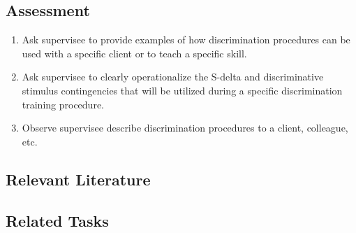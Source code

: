 \subsection{Assessment}
\begin{enumerate}
\item Ask supervisee to provide examples of how discrimination procedures can be used with a specific client or to teach a specific skill.
\item Ask supervisee to clearly operationalize the S-delta and discriminative stimulus contingencies that will be utilized during a specific discrimination training procedure.
\item Observe supervisee describe discrimination procedures to a client, colleague, etc.
\end{enumerate}
%
\subsection{Relevant Literature}
\begin{refsection}
\nocite{cooper2007applied,
        malott2003principles,
        taylor2014discrimination}
\printbibliography[heading=none]
\end{refsection}
%
\subsection{Related Tasks}
\fourdEight{}\\
\foureOne{}\\
\foureThree{}\\
\foureThirteen{}\\
\fourjEleven{}\\
\fourFKEleven{}\\
\fourFKTwentyFour{}\\
\fourFKTwentyFive{}\\
\fourFKThirtyFive{}\\
